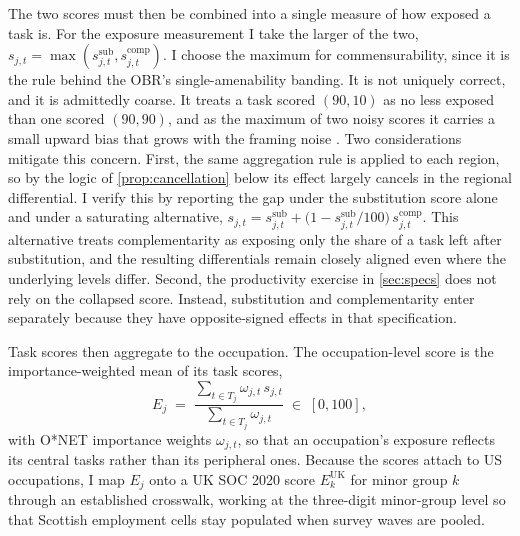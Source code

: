 The two scores must then be combined into a single measure of how exposed a task is. For the exposure measurement I take the larger of the two, $s_{j,t} = \max(s^{\mathrm{sub}}_{j,t}, s^{\mathrm{comp}}_{j,t})$. I choose the maximum for commensurability, since it is the rule behind the OBR's single-amenability banding. It is not uniquely correct, and it is admittedly coarse. It treats a task scored $(90,10)$ as no less exposed than one scored $(90,90)$, and as the maximum of two noisy scores it carries a small upward bias that grows with the framing noise \citep{clark1961}. Two considerations mitigate this concern. First, the same aggregation rule is applied to each region, so by the logic of \cref{prop:cancellation} below its effect largely cancels in the regional differential. I verify this by reporting the gap under the substitution score alone and under a saturating alternative, $s_{j,t} = s^{\mathrm{sub}}_{j,t} + \bigl(1 - s^{\mathrm{sub}}_{j,t}/100\bigr)\, s^{\mathrm{comp}}_{j,t}$. This alternative treats complementarity as exposing only the share of a task left after substitution, and the resulting differentials remain closely aligned even where the underlying levels differ. Second, the productivity exercise in \cref{sec:specs} does not rely on the collapsed score. Instead, substitution and complementarity enter separately because they have opposite-signed effects in that specification.

Task scores then aggregate to the occupation. The occupation-level score is the importance-weighted mean of its task scores,
\begin{equation}\label{eq:aggregate}
E_j \;=\; \frac{\sum_{t \in T_j} \omega_{j,t}\, s_{j,t}}
               {\sum_{t \in T_j} \omega_{j,t}} \;\in\; [0,100],
\end{equation}
with O*NET importance weights $\omega_{j,t}$, so that an occupation's exposure reflects its central tasks rather than its peripheral ones. Because the scores attach to US occupations, I map $E_j$ onto a UK SOC 2020 score $E^{\mathrm{UK}}_k$ for minor group $k$ through an established crosswalk, working at the three-digit minor-group level so that Scottish employment cells stay populated when survey waves are pooled.

